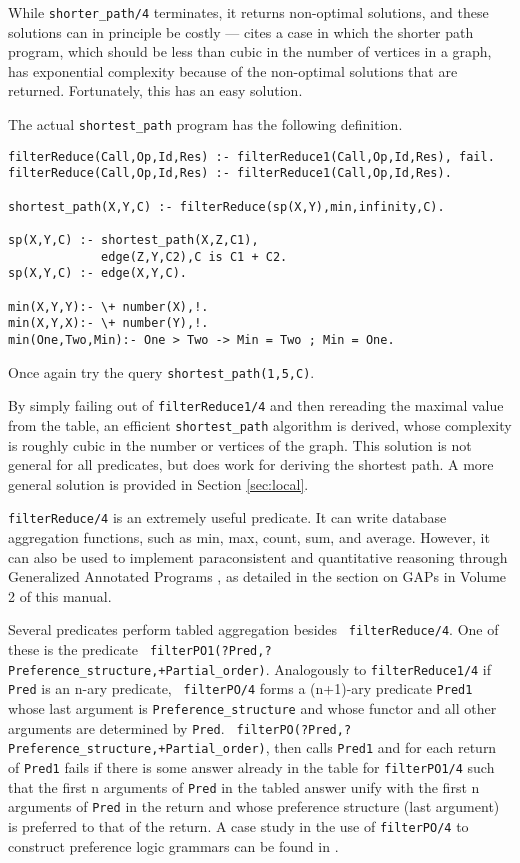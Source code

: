 While {\tt shorter\_path/4} terminates, it returns non-optimal
solutions, and these solutions can in principle be costly ---
\cite{JFLP-Scheduling} cites a case in which the shorter path program,
which should be less than cubic in the number of vertices in a graph,
has exponential complexity because of the non-optimal solutions that
are returned.  Fortunately, this has an easy solution.

\begin{exercise}
The actual {\tt shortest\_path} program has the following definition.
\begin{center}
\begin{minipage}{3.8in}
\begin{verbatim}
filterReduce(Call,Op,Id,Res) :- filterReduce1(Call,Op,Id,Res), fail.
filterReduce(Call,Op,Id,Res) :- filterReduce1(Call,Op,Id,Res).

shortest_path(X,Y,C) :- filterReduce(sp(X,Y),min,infinity,C).

sp(X,Y,C) :- shortest_path(X,Z,C1),
             edge(Z,Y,C2),C is C1 + C2.
sp(X,Y,C) :- edge(X,Y,C).

min(X,Y,Y):- \+ number(X),!.
min(X,Y,X):- \+ number(Y),!.
min(One,Two,Min):- One > Two -> Min = Two ; Min = One.
\end{verbatim}						       
\end{minipage}
\end{center}
Once again try the query {\tt shortest\_path(1,5,C)}.
\end{exercise}

By simply failing out of {\tt filterReduce1/4} and then rereading the
maximal value from the table, an efficient {\tt shortest\_path}
algorithm is derived, whose complexity is roughly cubic in the number
or vertices of the graph.  This solution is not general for all
predicates, but does work for deriving the shortest path.  A more
general solution is provided in Section \ref{sec:local}.

{\tt filterReduce/4} is an extremely useful predicate.  It can write
database aggregation functions, such as min, max, count, sum, and
average.  However, it can also be used to implement paraconsistent and
quantitative reasoning through Generalized Annotated Programs
\cite{KiSu92}, as detailed in the section on GAPs in Volume 2 of this
manual.

Several predicates perform tabled aggregation besides {\tt
filterReduce/4}.  One of these is the predicate {\tt
filterPO1(?Pred,?Preference\_structure,+Partial\_order)}.  Analogously
to {\tt filterReduce1/4} if {\tt Pred} is an n-ary predicate, {\tt
filterPO/4} forms a (n+1)-ary predicate {\tt Pred1} whose last
argument is {\tt Preference\_structure} and whose functor and all
other arguments are determined by {\tt Pred}.  {\tt
filterPO(?Pred,?Preference\_structure,+Partial\_order)}, then calls
{\tt Pred1} and for each return of {\tt Pred1} fails if there is some
answer already in the table for {\tt filterPO1/4} such that the first
n arguments of {\tt Pred} in the tabled answer unify with the first n
arguments of {\tt Pred} in the return and whose preference structure
(last argument) is preferred to that of the return.  A case study in
the use of {\tt filterPO/4} to construct preference logic grammars can
be found in \cite{CuSW99a}.

